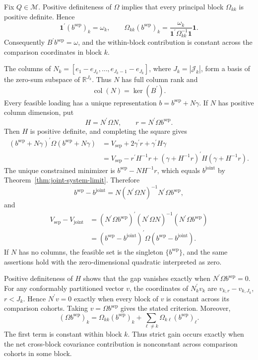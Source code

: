 Fix \(Q\in\mathcal M\). Positive definiteness of \(\Omega\) implies that every principal block \(\Omega_{kk}\) is positive definite. Hence
\[
 \mathbf 1^{\prime}(b^{\mathrm{sep}})_k=\omega_k,
 \qquad
 \Omega_{kk}(b^{\mathrm{sep}})_k
 =\frac{\omega_k}{\mathbf 1^{\prime}\Omega_{kk}^{-1}\mathbf 1}
 \mathbf 1.
\]
Consequently \(B^{\prime}b^{\mathrm{sep}}=\omega\), and the within-block contribution is constant across the comparison coordinates in block \(k\).

The columns of \(N_k=[e_1-e_{J_k},\ldots,e_{J_k-1}-e_{J_k}]\), where \(J_k=|\mathcal J_k|\), form a basis of the zero-sum subspace of \(\mathbb R^{J_k}\). Thus \(N\) has full column rank and
\[
 \operatorname{col}(N)=\ker(B^{\prime}).
\]
Every feasible loading has a unique representation \(b=b^{\mathrm{sep}}+N\gamma\). If \(N\) has positive column dimension, put
\[
 H=N^{\prime}\Omega N,
 \qquad
 r=N^{\prime}\Omega b^{\mathrm{sep}}.
\]
Then \(H\) is positive definite, and completing the square gives
\[
\begin{aligned}
 (b^{\mathrm{sep}}+N\gamma)^{\prime}\Omega
 (b^{\mathrm{sep}}+N\gamma)
 &=V_{\mathrm{sep}}+2\gamma^{\prime}r+
 \gamma^{\prime}H\gamma\\
 &=V_{\mathrm{sep}}-r^{\prime}H^{-1}r
 +(\gamma+H^{-1}r)^{\prime}H(\gamma+H^{-1}r).
\end{aligned}
\]
The unique constrained minimizer is \(b^{\mathrm{sep}}-NH^{-1}r\), which equals \(b^{\mathrm{joint}}\) by Theorem~\ref{thm:joint-system-limit}. Therefore
\[
 b^{\mathrm{sep}}-b^{\mathrm{joint}}
 =N(N^{\prime}\Omega N)^{-1}N^{\prime}\Omega b^{\mathrm{sep}},
\]
and
\[
\begin{aligned}
 V_{\mathrm{sep}}-V_{\mathrm{joint}}
 &=(N^{\prime}\Omega b^{\mathrm{sep}})^{\prime}
 (N^{\prime}\Omega N)^{-1}
 (N^{\prime}\Omega b^{\mathrm{sep}})\\
 &=(b^{\mathrm{sep}}-b^{\mathrm{joint}})^{\prime}
 \Omega(b^{\mathrm{sep}}-b^{\mathrm{joint}}).
\end{aligned}
\]
If \(N\) has no columns, the feasible set is the singleton \(\{b^{\mathrm{sep}}\}\), and the same assertions hold with the zero-dimensional quadratic interpreted as zero.

Positive definiteness of \(H\) shows that the gap vanishes exactly when \(N^{\prime}\Omega b^{\mathrm{sep}}=0\). For any conformably partitioned vector \(v\), the coordinates of \(N_k^{\prime}v_k\) are \(v_{k,r}-v_{k,J_k}\), \(r<J_k\). Hence \(N^{\prime}v=0\) exactly when every block of \(v\) is constant across its comparison cohorts. Taking \(v=\Omega b^{\mathrm{sep}}\) gives the stated criterion. Moreover,
\[
 (\Omega b^{\mathrm{sep}})_k
 =\Omega_{kk}(b^{\mathrm{sep}})_k
 +\sum_{\ell\ne k}\Omega_{k\ell}(b^{\mathrm{sep}})_\ell.
\]
The first term is constant within block \(k\). Thus strict gain occurs exactly when the net cross-block covariance contribution is nonconstant across comparison cohorts in some block.

